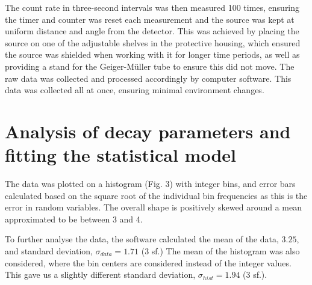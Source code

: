 \documentclass[11pt]{article}
\begin{document}
\noindent The count rate in three-second intervals was then measured 100 times, ensuring the timer and counter was reset each measurement and the source was kept at uniform distance and angle from the detector. This was achieved by placing the source on one of the adjustable shelves in the protective housing, which ensured the source was shielded when working with it for longer time periods, as well as providing a stand for the Geiger-Müller tube to ensure this did not move. The raw data was collected and processed accordingly by computer software. This data was collected all at once, ensuring minimal environment changes.
\section{Analysis of decay parameters and fitting the statistical model}
The data was plotted on a histogram (Fig. 3) with integer bins, and error bars calculated based on the square root of the individual bin frequencies as this is the error in random variables.  The overall shape is positively skewed around a mean approximated to be between 3 and 4.

\noindent To further analyse the data, the software calculated the mean of the data, $3.25$, and standard deviation, $\sigma_{data} = 1.71 $ (3 sf.)
The mean of the histogram was also considered, where the bin centers are considered instead of the integer values. This gave us a slightly different standard deviation, $\sigma_{hist} = 1.94$ (3 sf.). 
\end{document}
